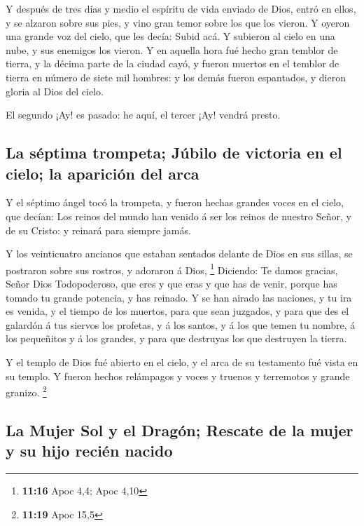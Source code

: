  Y después de tres días y medio el espíritu de vida enviado
de Dios, entró en ellos, y se alzaron sobre sus pies, y vino gran temor
sobre los que los vieron.  Y oyeron una grande voz del
cielo, que les decía: Subid acá. Y subieron al cielo en una nube, y sus
enemigos los vieron.  Y en aquella hora fué hecho gran
temblor de tierra, y la décima parte de la ciudad cayó, y fueron muertos
en el temblor de tierra en número de siete mil hombres: y los demás
fueron espantados, y dieron gloria al Dios del cielo.

 El segundo ¡Ay! es pasado: he aquí, el tercer ¡Ay! vendrá
presto.

\hypertarget{la-suxe9ptima-trompeta-juxfabilo-de-victoria-en-el-cielo-la-apariciuxf3n-del-arca}{%
\subsection{La séptima trompeta; Júbilo de victoria en el cielo; la
aparición del
arca}\label{la-suxe9ptima-trompeta-juxfabilo-de-victoria-en-el-cielo-la-apariciuxf3n-del-arca}}

 Y el séptimo ángel tocó la trompeta, y fueron hechas
grandes voces en el cielo, que decían: Los reinos del mundo han venido á
ser los reinos de nuestro Señor, y de su Cristo: y reinará para siempre
jamás.

 Y los veinticuatro ancianos que estaban sentados delante
de Dios en sus sillas, se postraron sobre sus rostros, y adoraron á
Dios, \footnote{\textbf{11:16} Apoc 4,4; Apoc 4,10} 
Diciendo: Te damos gracias, Señor Dios Todopoderoso, que eres y que eras
y que has de venir, porque has tomado tu grande potencia, y has reinado.
 Y se han airado las naciones, y tu ira es venida, y el
tiempo de los muertos, para que sean juzgados, y para que des el
galardón á tus siervos los profetas, y á los santos, y á los que temen
tu nombre, á los pequeñitos y á los grandes, y para que destruyas los
que destruyen la tierra.

 Y el templo de Dios fué abierto en el cielo, y el arca de
su testamento fué vista en su templo. Y fueron hechos relámpagos y voces
y truenos y terremotos y grande granizo. \footnote{\textbf{11:19} Apoc
  15,5}

\hypertarget{la-mujer-sol-y-el-draguxf3n-rescate-de-la-mujer-y-su-hijo-reciuxe9n-nacido}{%
\subsection{La Mujer Sol y el Dragón; Rescate de la mujer y su hijo
recién
nacido}\label{la-mujer-sol-y-el-draguxf3n-rescate-de-la-mujer-y-su-hijo-reciuxe9n-nacido}}

